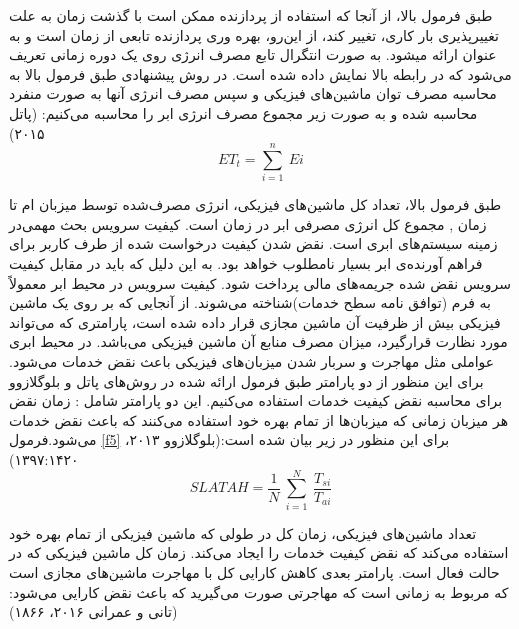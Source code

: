 طبق فرمول بالا، از آنجا  که استفاده از پردازنده ممکن است با گذشت زمان به علت تغییرپذیری بار کاری­، تغییر کند­، از این‌رو، بهره وری پردازنده تابعی از زمان است و به عنوان 
ارائه می­شود­.
 به صورت انتگرال تابع مصرف انرژی روی یک دوره زمانی تعریف می‌شود که در رابطه بالا نمایش داده شده است. در روش پیشنهادی طبق فرمول بالا به محاسبه مصرف توان ماشین‌های فیزیکی و سپس مصرف انرژی آنها به صورت منفرد محاسبه شده و به صورت زیر مجموع مصرف انرژی ابر را محاسبه می‌کنیم: (پاتل ۲۰۱۵)
\begin{equation}
ET_t = \sum_{i=1}^{n}\:Ei
\label{f4}
\end{equation}

طبق فرمول بالا،
 تعداد کل ماشین‌های فیزیکی­،
  انرژی مصرف‌شده توسط میزبان 
   ام تا زمان
   ,
  مجموع کل انرژی مصرفی ابر در زمان
   است­.
   کیفیت سرویس بحث مهمی‌در زمینه سیستم‌های ابری است. نقض شدن کیفیت درخواست شده از طرف کاربر برای فراهم آورنده‌ی ابر بسیار نامطلوب خواهد بود. به این دلیل که باید در مقابل کیفیت سرویس نقض شده جریمه‌های مالی پرداخت شود. کیفیت سرویس در محیط ابر معمولاً به فرم
   (توافق نامه سطح خدمات)شناخته می‌شوند. از آنجایی که بر روی یک ماشین فیزیکی بیش از ظرفیت آن ماشین مجازی قرار داده‌ شده ‌است، پارامتری که می‌تواند مورد نظارت قرار‌گیرد، میزان مصرف منابع آن ماشین فیزیکی می‌باشد. 
   در محیط ابری عواملی مثل مهاجرت و سربار شدن میزبان‌های فیزیکی باعث نقض خدمات می‌شود. برای این منظور از دو پارامتر طبق فرمول ارائه شده در روش‌های پاتل و بلوگلازوو 
   برای محاسبه نقض کیفیت خدمات استفاده می‌کنیم. این دو پارامتر شامل :
   زمان نقض
   هر میزبان
   زمانی که میزبان‌ها از تمام بهره خود استفاده می‌کنند که باعث نقض خدمات می‌شود.فرمول
\ref{f5}
    برای این منظور در زیر بیان شده است:(بلوگلازوو ۲۰۱۳، ۱۳۹۷:۱۴۲۰)
\begin{equation}
SLATAH=\frac{1}{N}\:\sum_{i=1}^{N}\:\frac{T_{si}}{T_{ai}}
\label{f5}
\end{equation}
   
   تعداد ماشین‌های فیزیکی،
      زمان کل در طولی که ماشین فیزیکی 
    از تمام بهره خود استفاده می‌کند که نقض کیفیت خدمات را ایجاد می‌کند. 
      زمان کل ماشین فیزیکی 
    که در حالت فعال است. 
   پارامتر بعدی کاهش کارایی کل با مهاجرت ماشین‌های مجازی
   است که مربوط به زمانی است که مهاجرتی صورت می‌گیرید که باعث نقض کارایی می‌شود: 
(تانی و عمرانی ۲۰۱۶، ۱۸۶۶)

